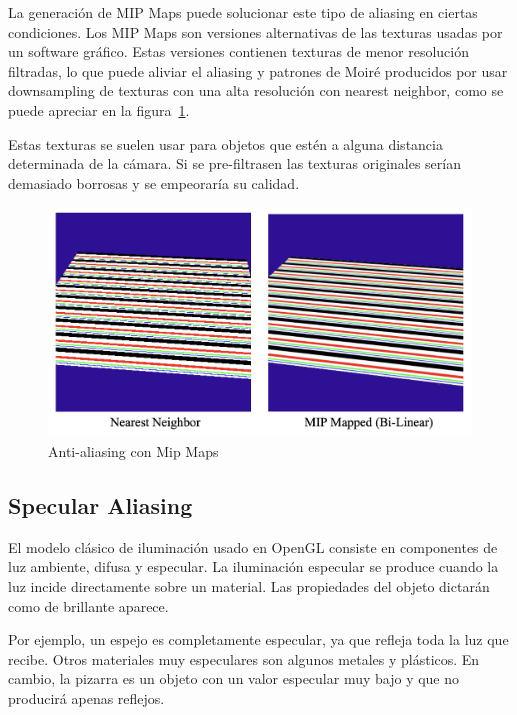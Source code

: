\documentclass[withindex, glossary]{cam-thesis}
\begin{document}
La generación de MIP Maps puede solucionar este tipo de aliasing en ciertas condiciones. Los MIP Maps son versiones alternativas de las texturas usadas por un software gráfico. Estas versiones contienen texturas de menor resolución filtradas, lo que puede aliviar el aliasing y patrones de Moiré producidos por usar downsampling de texturas con una alta resolución con nearest neighbor, como se puede apreciar en la figura~\ref{mipmaps}.

Estas texturas se suelen usar para objetos que estén a alguna distancia determinada de la cámara. Si se pre-filtrasen las texturas originales serían demasiado borrosas y se empeoraría su calidad.

\begin{figure}[!htbp]
    \includegraphics[width=.8\linewidth]{figures/mipmaps.png}
    \caption{Anti-aliasing con Mip Maps}
    \label{mipmaps}
\end{figure}

\subsection{Specular Aliasing}

El modelo clásico de iluminación usado en OpenGL consiste en componentes de luz ambiente, difusa y especular\cite{Shreiner:2013:OPG:2544032}. La iluminación especular se produce cuando la luz incide directamente sobre un material. Las propiedades del objeto dictarán como de brillante aparece.

Por ejemplo, un espejo es completamente especular, ya que refleja toda la luz que recibe. Otros materiales muy especulares son algunos metales y plásticos. En cambio, la pizarra es un objeto con un valor especular muy bajo y que no producirá apenas reflejos.
\end{document}
